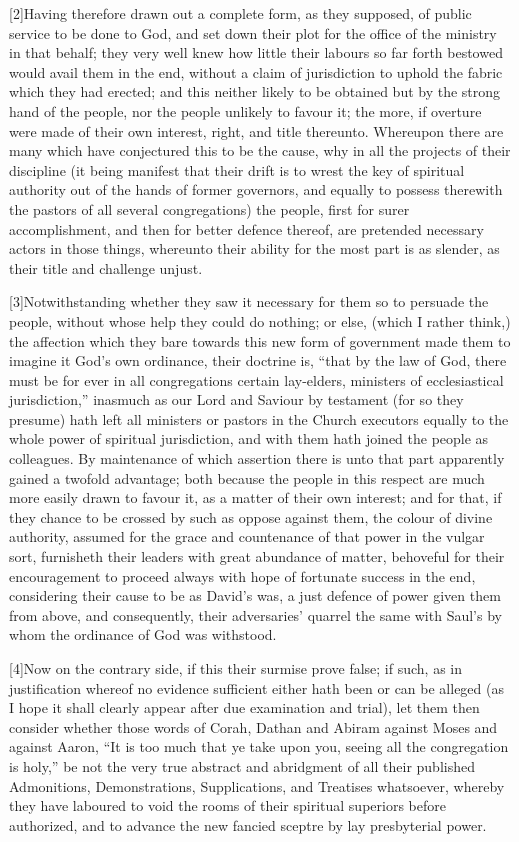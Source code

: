 [2]Having therefore drawn out a complete form, as they supposed, of public service to be done to God, and set down their plot for the office of the ministry in that behalf; they very well knew how little their labours so far forth bestowed would avail them in the end, without a claim of jurisdiction to uphold the fabric which they had erected; and this neither likely to be obtained but by the strong hand of the people, nor the people unlikely to favour it; the more, if overture were made of their own interest, right, and title thereunto. Whereupon there are many which have conjectured this to be the cause, why in all the projects of their discipline (it being manifest that their drift is to wrest the key of spiritual authority out of the hands of former governors, and equally to possess therewith the pastors of all several congregations) the people, first for surer accomplishment, and then for better defence thereof, are pretended necessary actors in those things, whereunto their ability for the most part is as slender, as their title and challenge unjust.

[3]Notwithstanding whether they saw it necessary for them so to persuade the people,  without whose help they could do nothing; or else, (which I rather think,) the affection which they bare towards this new form of government made them to imagine it God’s own ordinance, their doctrine is, “that by the law of God, there must be for ever in all congregations certain lay-elders, ministers of ecclesiastical jurisdiction,” inasmuch as our Lord and Saviour by testament (for so they presume) hath left all ministers or pastors in the Church executors equally to the whole power of spiritual jurisdiction, and with them hath joined the people as colleagues. By maintenance of which assertion there is unto that part apparently gained a twofold advantage; both because the people in this respect are much more easily drawn to favour it, as a matter of their own interest; and for that, if they chance to be crossed by such as oppose against them, the colour of divine authority, assumed for the grace and countenance of that power in the vulgar sort, furnisheth their leaders with great abundance of matter, behoveful for their encouragement to proceed always with hope of fortunate success in the end, considering their cause to be as David’s was, a just defence of power given them from above, and consequently, their adversaries’ quarrel the same with Saul’s by whom the ordinance of God was withstood.

[4]Now on the contrary side, if this their surmise prove false; if such, as in justification whereof no evidence sufficient either hath been or can be alleged (as I hope it shall clearly appear after due examination and trial), let them then consider whether those words of Corah, Dathan and Abiram against Moses and against Aaron, “It is too much that ye take upon you, seeing all the congregation is holy,” be not the very true abstract and abridgment of all their published Admonitions, Demonstrations, Supplications, and Treatises whatsoever, whereby they have laboured to void the rooms of their spiritual superiors before authorized, and to advance the new fancied sceptre by lay presbyterial power.

